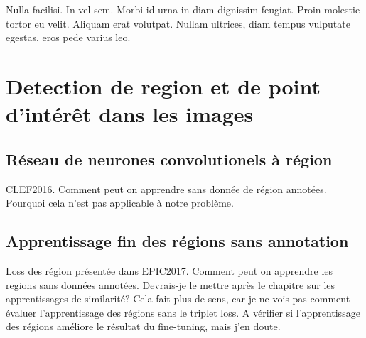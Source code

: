 \begin{savequote}[75mm] 
Nulla facilisi. In vel sem. Morbi id urna in diam dignissim feugiat. Proin molestie tortor eu velit. Aliquam erat volutpat. Nullam ultrices, diam tempus vulputate egestas, eros pede varius leo.
\end{savequote}

\chapter{Detection de region et de point d'intérêt dans les images}

\section{Réseau de neurones convolutionels à région}

CLEF2016. Comment peut on apprendre sans donnée de région annotées.
Pourquoi cela n'est pas applicable à notre problème. 

\section{Apprentissage fin des régions sans annotation}

Loss des région présentée dans EPIC2017.
Comment peut on apprendre les regions sans données annotées.
Devrais-je le mettre après le chapitre sur les apprentissages de similarité? Cela fait plus de sens, car je ne vois pas comment évaluer l'apprentissage des régions sans le triplet loss. A vérifier si l'apprentissage des régions améliore le résultat du fine-tuning, mais j'en doute.

